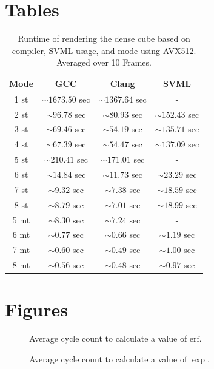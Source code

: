 \documentclass[a4paper, 11pt]{memoir}
\newcommand*{\erf}{\text{erf}}
\begin{document}
    \chapter{Tables}
    \label{ch:tables}
    \begin{table}[b]
        \centering
        \begin{tabular}{|c | c | c | c|}
            \hline
            Mode & GCC               & Clang             & SVML\\\hline
            1 st & $\sim1673.50$ sec & $\sim1367.64$ sec & - \\
            2 st & $\sim96.78$ sec   & $\sim80.93$ sec   & $\sim152.43$ sec\\
            3 st & $\sim69.46$ sec   & $\sim54.19$ sec   & $\sim135.71$ sec\\
            4 st & $\sim67.39$ sec   & $\sim54.47$ sec   & $\sim137.09$ sec\\
            5 st & $\sim210.41$ sec  & $\sim171.01$ sec  & - \\
            6 st & $\sim14.84$ sec   & $\sim11.73$ sec   & $\sim23.29$ sec\\
            7 st & $\sim9.32$ sec    & $\sim7.38$ sec    & $\sim18.59$ sec\\
            8 st & $\sim8.79$ sec    & $\sim7.01$ sec    & $\sim18.99$ sec\\\hline\hline

            5 mt & $\sim8.30$ sec    & $\sim7.24$ sec    & - \\
            6 mt & $\sim0.77$ sec    & $\sim0.66$ sec    & $\sim1.19$ sec\\
            7 mt & $\sim0.60$ sec    & $\sim0.49$ sec    & $\sim1.00$ sec\\
            8 mt & $\sim0.56$ sec    & $\sim0.48$ sec    & $\sim0.97$ sec\\
            \hline
        \end{tabular}
        \caption{Runtime of rendering the dense cube based on compiler, SVML usage, and mode using AVX512. Averaged over 10 Frames.}
        \label{tab:perf_dense_cube_avx512}
    \end{table}

    \chapter{Figures}
    \begin{figure}[t]
        \centering
        
        \caption{Average cycle count to calculate a value of $\erf$.}
        \label{fig:cycles_erf}
    \end{figure}
    \begin{figure}[t]
        \centering
        
        \caption{Average cycle count to calculate a value of $\exp$.}
        \label{fig:cycles_exp}
    \end{figure}
    
\end{document}
